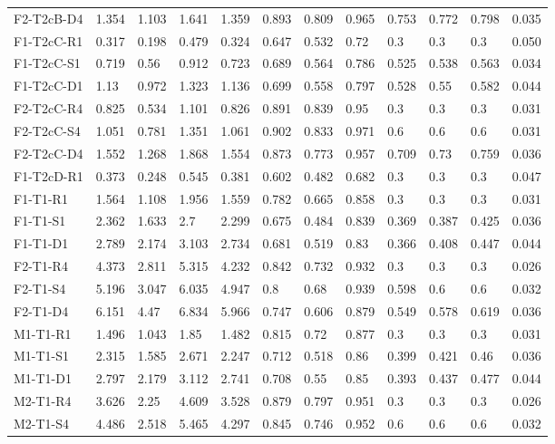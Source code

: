\begin{table}[ht]
\begin{tabular}{llllllllllll}
  F2-T2cB-D4 & 1.354 & 1.103 & 1.641 & 1.359 & 0.893 & 0.809 & 0.965 & 0.753 & 0.772 & 0.798 &    0.035  \\ 
  F1-T2cC-R1 & 0.317 & 0.198 & 0.479 & 0.324 & 0.647 & 0.532 & 0.72 & 0.3 & 0.3 & 0.3 &    0.050  \\ 
  F1-T2cC-S1 & 0.719 & 0.56 & 0.912 & 0.723 & 0.689 & 0.564 & 0.786 & 0.525 & 0.538 & 0.563 &    0.034  \\ 
  F1-T2cC-D1 & 1.13 & 0.972 & 1.323 & 1.136 & 0.699 & 0.558 & 0.797 & 0.528 & 0.55 & 0.582 &    0.044  \\ 
  F2-T2cC-R4 & 0.825 & 0.534 & 1.101 & 0.826 & 0.891 & 0.839 & 0.95 & 0.3 & 0.3 & 0.3 &    0.031  \\ 
  F2-T2cC-S4 & 1.051 & 0.781 & 1.351 & 1.061 & 0.902 & 0.833 & 0.971 & 0.6 & 0.6 & 0.6 &    0.031  \\ 
  F2-T2cC-D4 & 1.552 & 1.268 & 1.868 & 1.554 & 0.873 & 0.773 & 0.957 & 0.709 & 0.73 & 0.759 &    0.036  \\ 
  F1-T2cD-R1 & 0.373 & 0.248 & 0.545 & 0.381 & 0.602 & 0.482 & 0.682 & 0.3 & 0.3 & 0.3 &    0.047  \\ 
  F1-T1-R1 & 1.564 & 1.108 & 1.956 & 1.559 & 0.782 & 0.665 & 0.858 & 0.3 & 0.3 & 0.3 & 0.031 \\ 
  F1-T1-S1 & 2.362 & 1.633 & 2.7 & 2.299 & 0.675 & 0.484 & 0.839 & 0.369 & 0.387 & 0.425 & 0.036 \\ 
  F1-T1-D1 & 2.789 & 2.174 & 3.103 & 2.734 & 0.681 & 0.519 & 0.83 & 0.366 & 0.408 & 0.447 & 0.044 \\ 
  F2-T1-R4 & 4.373 & 2.811 & 5.315 & 4.232 & 0.842 & 0.732 & 0.932 & 0.3 & 0.3 & 0.3 & 0.026 \\ 
  F2-T1-S4 & 5.196 & 3.047 & 6.035 & 4.947 & 0.8 & 0.68 & 0.939 & 0.598 & 0.6 & 0.6 & 0.032 \\ 
  F2-T1-D4 & 6.151 & 4.47 & 6.834 & 5.966 & 0.747 & 0.606 & 0.879 & 0.549 & 0.578 & 0.619 & 0.036 \\ 
  M1-T1-R1 & 1.496 & 1.043 & 1.85 & 1.482 & 0.815 & 0.72 & 0.877 & 0.3 & 0.3 & 0.3 & 0.031 \\ 
  M1-T1-S1 & 2.315 & 1.585 & 2.671 & 2.247 & 0.712 & 0.518 & 0.86 & 0.399 & 0.421 & 0.46 & 0.036 \\ 
  M1-T1-D1 & 2.797 & 2.179 & 3.112 & 2.741 & 0.708 & 0.55 & 0.85 & 0.393 & 0.437 & 0.477 & 0.044 \\ 
  M2-T1-R4 & 3.626 & 2.25 & 4.609 & 3.528 & 0.879 & 0.797 & 0.951 & 0.3 & 0.3 & 0.3 & 0.026 \\ 
  M2-T1-S4 & 4.486 & 2.518 & 5.465 & 4.297 & 0.845 & 0.746 & 0.952 & 0.6 & 0.6 & 0.6 & 0.032 \\ 

\end{tabular}
\end{table}
